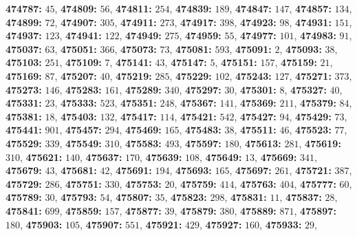 \textsf{\bfseries 474787:} $45$, \textsf{\bfseries 474809:} $56$, \textsf{\bfseries 474811:} $254$, \textsf{\bfseries 474839:} $189$, \textsf{\bfseries 474847:} $147$, \textsf{\bfseries 474857:} $134$, \textsf{\bfseries 474899:} $72$, \textsf{\bfseries 474907:} $305$, \textsf{\bfseries 474911:} $273$, \textsf{\bfseries 474917:} $398$, \textsf{\bfseries 474923:} $98$, \textsf{\bfseries 474931:} $151$, \textsf{\bfseries 474937:} $123$, \textsf{\bfseries 474941:} $122$, \textsf{\bfseries 474949:} $275$, \textsf{\bfseries 474959:} $55$, \textsf{\bfseries 474977:} $101$, \textsf{\bfseries 474983:} $91$, \textsf{\bfseries 475037:} $63$, \textsf{\bfseries 475051:} $366$, \textsf{\bfseries 475073:} $73$, \textsf{\bfseries 475081:} $593$, \textsf{\bfseries 475091:} $2$, \textsf{\bfseries 475093:} $38$, \textsf{\bfseries 475103:} $251$, \textsf{\bfseries 475109:} $7$, \textsf{\bfseries 475141:} $43$, \textsf{\bfseries 475147:} $5$, \textsf{\bfseries 475151:} $157$, \textsf{\bfseries 475159:} $21$, \textsf{\bfseries 475169:} $87$, \textsf{\bfseries 475207:} $40$, \textsf{\bfseries 475219:} $285$, \textsf{\bfseries 475229:} $102$, \textsf{\bfseries 475243:} $127$, \textsf{\bfseries 475271:} $373$, \textsf{\bfseries 475273:} $146$, \textsf{\bfseries 475283:} $161$, \textsf{\bfseries 475289:} $340$, \textsf{\bfseries 475297:} $30$, \textsf{\bfseries 475301:} $8$, \textsf{\bfseries 475327:} $40$, \textsf{\bfseries 475331:} $23$, \textsf{\bfseries 475333:} $523$, \textsf{\bfseries 475351:} $248$, \textsf{\bfseries 475367:} $141$, \textsf{\bfseries 475369:} $211$, \textsf{\bfseries 475379:} $84$, \textsf{\bfseries 475381:} $18$, \textsf{\bfseries 475403:} $132$, \textsf{\bfseries 475417:} $114$, \textsf{\bfseries 475421:} $542$, \textsf{\bfseries 475427:} $94$, \textsf{\bfseries 475429:} $73$, \textsf{\bfseries 475441:} $901$, \textsf{\bfseries 475457:} $294$, \textsf{\bfseries 475469:} $165$, \textsf{\bfseries 475483:} $38$, \textsf{\bfseries 475511:} $46$, \textsf{\bfseries 475523:} $77$, \textsf{\bfseries 475529:} $339$, \textsf{\bfseries 475549:} $310$, \textsf{\bfseries 475583:} $493$, \textsf{\bfseries 475597:} $180$, \textsf{\bfseries 475613:} $281$, \textsf{\bfseries 475619:} $310$, \textsf{\bfseries 475621:} $140$, \textsf{\bfseries 475637:} $170$, \textsf{\bfseries 475639:} $108$, \textsf{\bfseries 475649:} $13$, \textsf{\bfseries 475669:} $341$, \textsf{\bfseries 475679:} $43$, \textsf{\bfseries 475681:} $42$, \textsf{\bfseries 475691:} $194$, \textsf{\bfseries 475693:} $165$, \textsf{\bfseries 475697:} $261$, \textsf{\bfseries 475721:} $387$, \textsf{\bfseries 475729:} $286$, \textsf{\bfseries 475751:} $330$, \textsf{\bfseries 475753:} $20$, \textsf{\bfseries 475759:} $414$, \textsf{\bfseries 475763:} $404$, \textsf{\bfseries 475777:} $60$, \textsf{\bfseries 475789:} $30$, \textsf{\bfseries 475793:} $54$, \textsf{\bfseries 475807:} $35$, \textsf{\bfseries 475823:} $298$, \textsf{\bfseries 475831:} $11$, \textsf{\bfseries 475837:} $28$, \textsf{\bfseries 475841:} $699$, \textsf{\bfseries 475859:} $157$, \textsf{\bfseries 475877:} $39$, \textsf{\bfseries 475879:} $380$, \textsf{\bfseries 475889:} $871$, \textsf{\bfseries 475897:} $180$, \textsf{\bfseries 475903:} $105$, \textsf{\bfseries 475907:} $551$, \textsf{\bfseries 475921:} $429$, \textsf{\bfseries 475927:} $160$, \textsf{\bfseries 475933:} $29$, 
